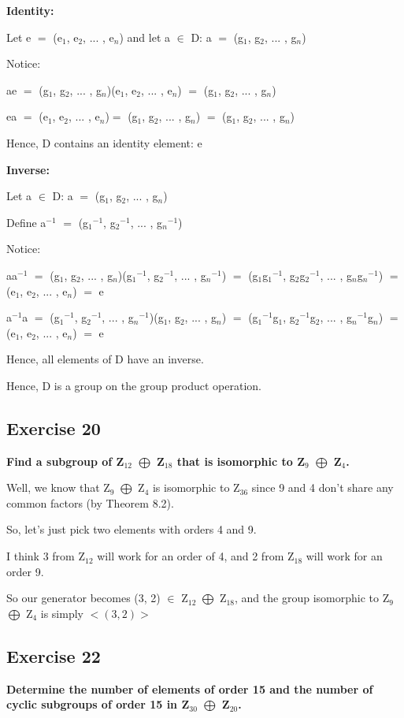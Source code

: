 \documentclass{article}
\newcommand{\mt}[1]{\ensuremath{#1}}
\newcommand\ssc[2][\DefaultOpt]{%
  \def\DefaultOpt{#2}%
  \subsection[#1]{#2}%
}
\newcommand{\mem}{\mt{\in} }
\newcommand{\eql}{\mt{=} }
\newcommand{\uw}[2]{#1\mt{_{#2}}}
\newcommand{\uf}[2]{#1\mt{^{#2}}}
\newcommand{\edp}{\mt{\bigoplus} }
\begin{document}
{{\textbf{Identity:}

Let e \eql (\uw{e}{1}, \uw{e}{2}, ... , \uw{e}{n}) and let a \mem D: a \eql (\uw{g}{1}, \uw{g}{2}, ... , \uw{g}{n}) 

Notice: 

ae \eql (\uw{g}{1}, \uw{g}{2}, ... , \uw{g}{n})(\uw{e}{1}, \uw{e}{2}, ... , \uw{e}{n}) \eql (\uw{g}{1}, \uw{g}{2}, ... , \uw{g}{n})

ea \eql (\uw{e}{1}, \uw{e}{2}, ... , \uw{e}{n})\eql (\uw{g}{1}, \uw{g}{2}, ... , \uw{g}{n}) \eql (\uw{g}{1}, \uw{g}{2}, ... , \uw{g}{n})

Hence, D contains an identity element: e 

\textbf{Inverse:}

Let a \mem D: a \eql (\uw{g}{1}, \uw{g}{2}, ... , \uw{g}{n}) 

Define \uf{a}{-1} \eql (\uf{\uw{g}{1}}{-1}, \uf{\uw{g}{2}}{-1}, ... , \uf{\uw{g}{n}}{-1}) 

Notice:

a\uf{a}{-1} \eql (\uw{g}{1}, \uw{g}{2}, ... , \uw{g}{n})(\uf{\uw{g}{1}}{-1}, \uf{\uw{g}{2}}{-1}, ... , \uf{\uw{g}{n}}{-1}) \eql (\uw{g}{1}\uf{\uw{g}{1}}{-1}, \uw{g}{2}\uf{\uw{g}{2}}{-1}, ... , \uw{g}{n}\uf{\uw{g}{n}}{-1}) \eql (\uw{e}{1}, \uw{e}{2}, ... , \uw{e}{n}) \eql e

\uf{a}{-1}a \eql (\uf{\uw{g}{1}}{-1}, \uf{\uw{g}{2}}{-1}, ... , \uf{\uw{g}{n}}{-1})(\uw{g}{1}, \uw{g}{2}, ... , \uw{g}{n}) \eql (\uf{\uw{g}{1}}{-1}\uw{g}{1}, \uf{\uw{g}{2}}{-1}\uw{g}{2}, ... , \uf{\uw{g}{n}}{-1}\uw{g}{n}) \eql (\uw{e}{1}, \uw{e}{2}, ... , \uw{e}{n}) \eql e

Hence, all elements of D have an inverse.

Hence, D is a group on the group product operation.
}
\ssc{Exercise 20}{
\textbf{Find a subgroup of \uw{Z}{12} \edp \uw{Z}{18} that is isomorphic to \uw{Z}{9} \edp \uw{Z}{4}.}

Well, we know that \uw{Z}{9} \edp \uw{Z}{4} is isomorphic to \uw{Z}{36} since 9 and 4 don't share any common factors (by Theorem 8.2).

So, let's just pick two elements with orders 4 and 9.

I think 3 from \uw{Z}{12} will work for an order of 4, and 2 from \uw{Z}{18} will work for an order 9.

So our generator becomes (3, 2) \mem \uw{Z}{12} \edp \uw{Z}{18}, and the group isomorphic to \uw{Z}{9} \edp \uw{Z}{4} is simply \mt{<(3, 2)>}

}
\ssc{Exercise 22}{
\textbf{Determine the number of elements of order 15 and the number of cyclic subgroups of order 15 in \uw{Z}{30} \edp \uw{Z}{20}.}


}
}
\end{document}
